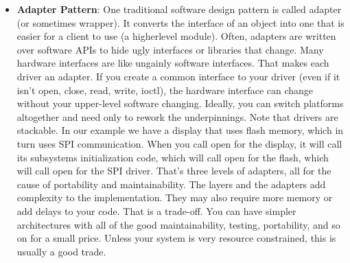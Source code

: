 \documentclass{report}
\begin{document}
\begin{itemize}
\begin{itemize}
                \item spi.ioctl\_changeFrequency(THIRTY\_MHz)
                \item SpiIoctl(kChangeFrequency, THIRTY\_MHz)
            \end{itemize}
            This interface straightens out the kinks that can happen at the driver level, making them less specific to the application and creating reusable code. Further, when others come up to your code and the driver looks like it has these functions, they will know what to expect.
            \bigbreak \noindent 
            The driver model in Unix sometimes includes two newer functions. The first, select (or poll), waits for the device to change state. That used to be done by getting empty reads or polling ioctl messages, but now it has its own function. The second, mmap, controls the memory map the driver shares with the code that calls it.
        \item \textbf{Adapter Pattern}: One traditional software design pattern is called adapter (or sometimes wrapper). It converts the interface of an object into one that is easier for a client to use (a higherlevel module). Often, adapters are written over software APIs to hide ugly interfaces or libraries that change.
            \bigbreak \noindent 
            Many hardware interfaces are like ungainly software interfaces. That makes each driver an adapter.
            \bigbreak \noindent 
            If you create a common interface to your driver (even if it isn’t open, close, read, write, ioctl), the hardware interface can change without your upper-level software changing. Ideally, you can switch platforms altogether and need only to rework the underpinnings.
            \bigbreak \noindent 
            \bigbreak \noindent 
            Note that drivers are stackable. In our example we have a display that uses flash memory, which in turn uses SPI communication. When you call open for the display, it will call its subsystems initialization code, which will call open for the flash, which will call open for the SPI driver. That’s three levels of adapters, all for the cause of portability and maintainability.
            \bigbreak \noindent 
            The layers and the adapters add complexity to the implementation. They may also require more memory or add delays to your code. That is a trade-off. You can have simpler architectures with all of the good maintainability, testing, portability, and so on for a small price. Unless your system is very resource constrained, this is usually a good trade.

\end{itemize}
\end{document}
